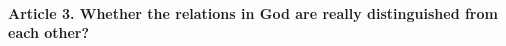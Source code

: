 \documentclass{ucetd}
\begin{document}
\paragraph{Article 3. Whether the relations in God are really distinguished from each other?}
\end{document}
